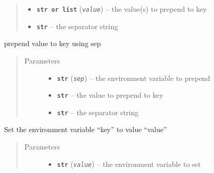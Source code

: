 \documentclass[a4paper,10pt,english]{sphinxmanual}
\begin{document}
\begin{fulllineitems}
\begin{fulllineitems}
\begin{quote}
\begin{description}
\begin{itemize}
\item {} 
\textbf{\texttt{str or list}} (\emph{\texttt{value}}) -- the value(s) to prepend to key

\item {} 
\textbf{\texttt{str}} -- the separator string

\end{itemize}

\end{description}\end{quote}

\end{fulllineitems}


\begin{fulllineitems}
\label{commands/apidoc/src:src.fileEnviron.LauncherFileEnviron.prepend_value}
prepend value to key using sep
\begin{quote}\begin{description}
\item[{Parameters}] \leavevmode\begin{itemize}
\item {} 
\textbf{\texttt{str}} (\emph{\texttt{sep}}) -- the environment variable to prepend

\item {} 
\textbf{\texttt{str}} -- the value to prepend to key

\item {} 
\textbf{\texttt{str}} -- the separator string

\end{itemize}

\end{description}\end{quote}

\end{fulllineitems}


\begin{fulllineitems}
\label{commands/apidoc/src:src.fileEnviron.LauncherFileEnviron.set}
Set the environment variable ``key'' to value ``value''
\begin{quote}\begin{description}
\item[{Parameters}] \leavevmode\begin{itemize}
\item {} 
\textbf{\texttt{str}} (\emph{\texttt{value}}) -- the environment variable to set


\end{itemize}
\end{description}
\end{quote}
\end{fulllineitems}
\end{fulllineitems}
\end{document}
